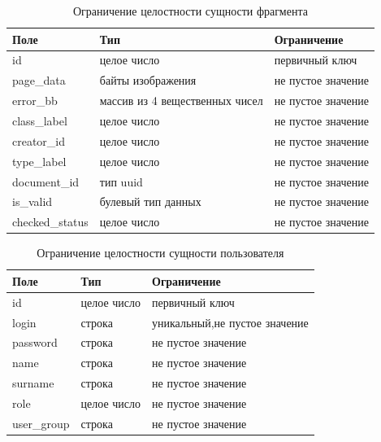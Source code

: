 \begin{table}[H]
	 \centering
	 \caption{Ограничение целостности сущности фрагмента}
	\begin{tabularx}{\textwidth}{|X|X|X|}
		\hline
		Поле & Тип & Ограничение \\
		\hline
		id & целое число & первичный ключ \\
		\hline
		page\_data & байты изображения & не пустое значение\\
		\hline
		error\_bb & массив из 4 вещественных чисел & не пустое значение\\
		\hline
		class\_label & целое число & не пустое значение\\
		\hline
		creator\_id & целое число & не пустое значение\\
		\hline
		type\_label & целое число & не пустое значение\\
		\hline
		document\_id & тип uuid &  не пустое значение\\
		\hline
		is\_valid & булевый тип данных & не пустое значение\\
		\hline
		checked\_status &  целое число & не пустое значение\\
		\hline
	\end{tabularx}
	\label{t:markups}
\end{table}




\begin{table}[H]
	\centering
	\caption{Ограничение целостности сущности пользователя}
	\begin{tabularx}{\textwidth}{|X|X|X|}
	\hline
	Поле & Тип & Ограничение \\
	\hline
	id & целое число & первичный ключ\\
	\hline
	login & строка & уникальный,не пустое значение\\
	\hline
	password & строка & не пустое значение\\
	\hline
	name & строка & не пустое значение\\
	\hline
	surname & строка & не пустое значение\\
	\hline
	role & целое число & не пустое значение\\
	\hline
	user\_group & строка & не пустое значение\\	
	\hline
	\end{tabularx}
	\label{t:users_cons}
\end{table}


